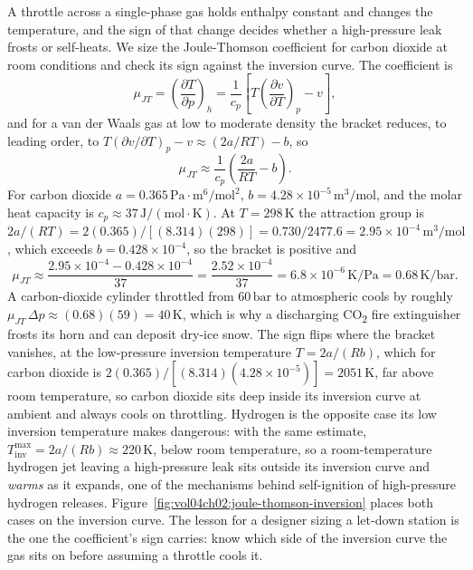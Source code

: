 A throttle across a single-phase gas holds enthalpy constant and changes the
temperature, and the sign of that change decides whether a high-pressure leak
frosts or self-heats. We size the Joule-Thomson coefficient for carbon
dioxide at room conditions and check its sign against the inversion curve.
The coefficient is
\[
\mu_{JT} = \left(\frac{\partial T}{\partial p}\right)_h = \frac{1}{c_p}
\left[T\left(\frac{\partial v}{\partial T}\right)_p - v\right],
\]
and for a van der Waals gas at low to moderate density the bracket reduces, to
leading order, to $T(\partial v/\partial T)_p - v \approx (2a/RT) - b$, so
\[
\mu_{JT} \approx \frac{1}{c_p}\left(\frac{2a}{RT} - b\right).
\]
For carbon dioxide $a = 0.365\,\text{Pa}\cdot\text{m}^6/\text{mol}^2$, $b =
4.28\times 10^{-5}\,\text{m}^3/\text{mol}$, and the molar heat capacity is
$c_p \approx 37\,\text{J}/(\text{mol}\cdot\si{\kelvin})$. At $T = 298\,
\si{\kelvin}$ the attraction group is $2a/(RT) = 2(0.365)/[(8.314)(298)] =
0.730/2477.6 = 2.95\times 10^{-4}\,\text{m}^3/\text{mol}$, which exceeds $b =
0.428\times 10^{-4}$, so the bracket is positive and
\[
\mu_{JT} \approx \frac{2.95\times 10^{-4} - 0.428\times 10^{-4}}{37} =
\frac{2.52\times 10^{-4}}{37} = 6.8\times 10^{-6}\,\si{\kelvin}/\text{Pa}
= 0.68\,\si{\kelvin}/\text{bar}.
\]
A carbon-dioxide cylinder throttled from $60\,\text{bar}$ to atmospheric
cools by roughly $\mu_{JT}\,\Delta p \approx (0.68)(59) = 40\,\si{\kelvin}$,
which is why a discharging CO\textsubscript{2} fire extinguisher frosts its
horn and can deposit dry-ice snow. The sign flips where the bracket vanishes,
at the low-pressure inversion temperature $T = 2a/(Rb)$, which for carbon
dioxide is $2(0.365)/[(8.314)(4.28\times 10^{-5})] = 2051\,\si{\kelvin}$,
far above room temperature, so carbon dioxide sits deep inside its inversion
curve at ambient and always cools on throttling. Hydrogen is the opposite
case its low inversion temperature makes dangerous: with the same estimate,
$T_{\text{inv}}^{\max} = 2a/(Rb) \approx 220\,\si{\kelvin}$, below room
temperature, so a room-temperature hydrogen jet leaving a high-pressure leak
sits outside its inversion curve and \emph{warms} as it expands, one of the
mechanisms behind self-ignition of high-pressure hydrogen releases.
Figure~\ref{fig:vol04ch02:joule-thomson-inversion} places both cases on the
inversion curve. The lesson for a designer sizing a let-down station is the
one the coefficient's sign carries: know which side of the inversion curve
the gas sits on before assuming a throttle cools it.



